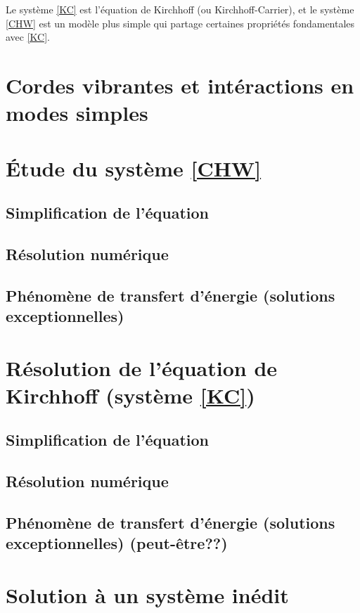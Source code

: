 \documentclass[10pt,a4paper]{article}
\begin{document}
Le système \eqref{KC} est l'équation de Kirchhoff (ou Kirchhoff-Carrier), et le système \eqref{CHW} est un modèle plus simple qui partage certaines propriétés fondamentales avec \eqref{KC}.


\section{Cordes vibrantes et intéractions en modes simples}

\section{Étude du système \eqref{CHW}}

    \subsection{Simplification de l'équation}
    \subsection{Résolution numérique}
    \subsection{Phénomène de transfert d'énergie (solutions exceptionnelles)}
\section{Résolution de l'équation de Kirchhoff (système \eqref{KC})}
    \subsection{Simplification de l'équation}
    \subsection{Résolution numérique}
    \subsection{Phénomène de transfert d'énergie (solutions exceptionnelles) (peut-être??)}

\section{Solution à un système inédit}
\end{document}
